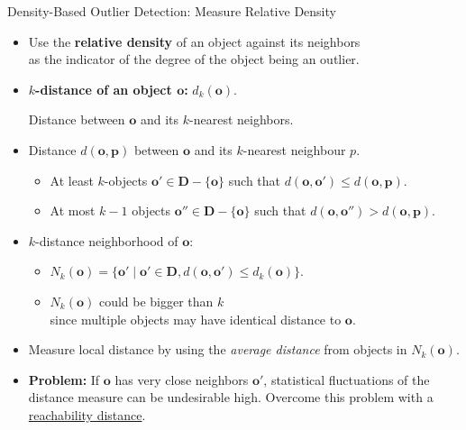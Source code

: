 \begin{frame}{Density-Based Outlier Detection: Measure Relative Density}
	\begin{itemize}
		\item Use the \textbf{relative density} of an object against its neighbors \\
		      as the indicator of the degree of the object being an outlier.
		\item \textbf{{\color{airforceblue}$k$-distance} of an object $\mathbf{o}$:} $d_k(\mathbf{o})$.

		      Distance between $\mathbf{o}$ and its $k$-nearest neighbors.
		\item Distance $d(\mathbf{o}, \mathbf{p})$ between $\mathbf{o}$ and its $k$-nearest neighbour $p$.
		      \begin{itemize}
			      \item At least $k$-objects $\textbf{o}' \in \mathbf{D} - \{\mathbf{o}\}$
			            such that $d(\mathbf{o}, \mathbf{o}') \leq d(\mathbf{o}, \mathbf{p})$.
			      \item At most $k-1$ objects $\mathbf{o}'' \in \mathbf{D} - \{\mathbf{o}\}$
			            such that $d(\mathbf{o}, \mathbf{o}'') > d(\mathbf{o}, \mathbf{p})$.
		      \end{itemize}
		\item $k$-distance neighborhood of $\mathbf{o}$:
		      \begin{itemize}
			      \item $N_k(\mathbf{o}) = \{\mathbf{o}' \; \vert \; \mathbf{o}' \in \mathbf{D}, d(\mathbf{o}, \mathbf{o}') \leq d_k(\mathbf{o})\}$.
			      \item $N_k(\mathbf{o})$ could be bigger than $k$ \\
			            since multiple objects may have identical distance to $\mathbf{o}$.
		      \end{itemize}
		\item Measure local distance by using the \textit{average distance} from objects in $N_k(\mathbf{o})$.
		\item \textbf{Problem:} If $\mathbf{o}$ has very close neighbors $\mathbf{o}'$, statistical fluctuations of the distance measure can be undesirable high. Overcome this problem with a \underline{reachability distance}.
	\end{itemize}
\end{frame}



